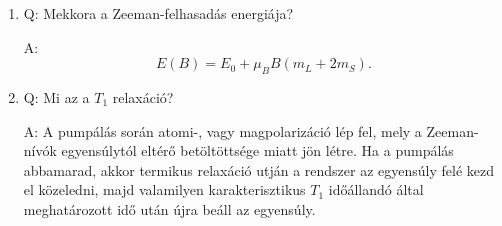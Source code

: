 \begin{enumerate}
    \item Q: Mekkora a Zeeman-felhasadás energiája?
    \begin{displayquote}
    	A:
    		\begin{equation}
    		E \left( B \right)
    		=
    		E_{0} + \mu_{B} B \left(m_{L} + 2m_{S} \right).
    		\end{equation}
    \end{displayquote}
    
    \item Q: Mi az a $T_{1}$ relaxáció?
    \begin{displayquote}
    	A: A pumpálás során atomi-, vagy magpolarizáció lép fel, mely a Zeeman-nívók egyensúlytól eltérő betöltöttsége miatt jön létre. Ha a pumpálás abbamarad, akkor termikus relaxáció utján a rendszer az egyensúly felé kezd el közeledni, majd valamilyen karakterisztikus $T_{1}$ időállandó által meghatározott idő után újra beáll az egyensúly.
    \end{displayquote}
\end{enumerate}